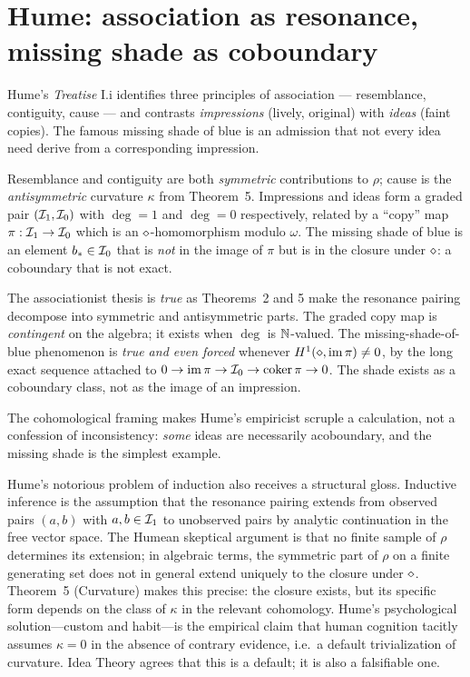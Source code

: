 \section{Hume: association as resonance, missing shade as
coboundary}\label{sec:hume}

 Hume's \emph{Treatise} I.i \cite{Hume1739}
identifies three principles of association --- resemblance, contiguity,
cause --- and contrasts \emph{impressions} (lively, original) with
\emph{ideas} (faint copies). The famous missing shade of blue is an
admission that not every idea need derive from a corresponding
impression.

\formalclaim Resemblance and contiguity are both \emph{symmetric}
contributions to $\rho$; cause is the \emph{antisymmetric} curvature
$\kappa$ from Theorem~5. Impressions and ideas form a graded pair
$(\mathcal{I}_1, \mathcal{I}_0)$ with $\deg=1$ and $\deg=0$ respectively, related
by a ``copy'' map $\pi: \mathcal{I}_1\to\mathcal{I}_0$ which is an
$\mathbin{\diamond}$-homomorphism modulo $\omega$. The missing shade of blue is an
element $b_*\in\mathcal{I}_0$ that is \emph{not} in the image of $\pi$ but is
in the closure under $\mathbin{\diamond}$: a coboundary that is not exact.

\formalstatus The associationist thesis is \emph{true} as Theorems~2 and
5 make the resonance pairing decompose into symmetric and antisymmetric
parts. The graded copy map is \emph{contingent} on the algebra; it
exists when $\deg$ is $\mathbb{N}$-valued. The missing-shade-of-blue
phenomenon is \emph{true and even forced} whenever
$H^1(\mathbin{\diamond}, \mathrm{im}\,\pi) \neq 0$, by the long exact sequence
attached to $0\to\mathrm{im}\,\pi\to\mathcal{I}_0\to\mathrm{coker}\,\pi\to
0$. The shade exists as a coboundary class, not as the image of an
impression.

\litcomment The cohomological framing makes Hume's empiricist scruple a
calculation, not a confession of inconsistency: \emph{some} ideas are
necessarily acoboundary, and the missing shade is the simplest example.

Hume's notorious problem of induction also receives a structural
gloss. Inductive inference is the assumption that the resonance
pairing extends from observed pairs $(a, b)$ with $a, b\in\mathcal{I}_1$ to
unobserved pairs by analytic continuation in the free vector space.
The Humean skeptical argument is that no finite sample of $\rho$
determines its extension; in algebraic terms, the symmetric part of
$\rho$ on a finite generating set does not in general extend uniquely
to the closure under $\mathbin{\diamond}$. Theorem~5 (Curvature) makes this
precise: the closure exists, but its specific form depends on the
class of $\kappa$ in the relevant cohomology. Hume's psychological
solution---custom and habit---is the empirical claim that human
cognition tacitly assumes $\kappa = 0$ in the absence of contrary
evidence, i.e.\ a default trivialization of curvature. Idea Theory
agrees that this is a default; it is also a falsifiable one.

